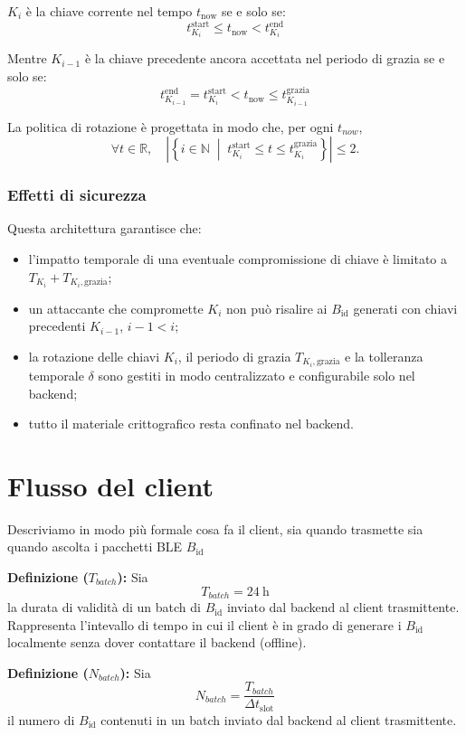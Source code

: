 \documentclass[a4paper,11pt]{article}
\begin{document}
$K_i$ è la chiave corrente nel tempo \(t_{\text{now}}\) se e solo se:
\[
  t_{K_i}^{\text{start}} \leq t_{\text{now}} < t_{K_i}^{\text{end}}
\]


Mentre $K_{i-1}$ è la chiave precedente ancora accettata nel periodo di grazia se e solo se:
\[
  t_{K_{i-1}}^{\text{end}} = t_{K_i}^{\text{start}} < t_{\text{now}} \leq t_{K_{i-1}}^{\text{grazia}}
\]

La politica di rotazione è progettata in modo che, per ogni $t_{now}$,
\[
  \forall t \in \mathbb{R}, \quad
  \left|
  \left\{
  i \in \mathbb{N}
  \;\middle|\;
  t_{K_i}^{\text{start}} \le t \le t_{K_i}^{\text{grazia}}
  \right\}
  \right| \le 2.
\]

\subsubsection{Effetti di sicurezza}
Questa architettura garantisce che:
\begin{itemize}
  \item l'impatto temporale di una eventuale compromissione di chiave è limitato a \(T_{K_i} + T_{K_i,\mathrm{grazia}}\);
  \item un attaccante che compromette \(K_i\) non può risalire ai \(B_{\text{id}}\) generati con chiavi precedenti \(K_{i-1}\), \(i-1 < i\);
  \item la rotazione delle chiavi \(K_i\), il periodo di grazia \(T_{K_i,\mathrm{grazia}}\) e la tolleranza temporale \(\delta\) sono gestiti in modo centralizzato e configurabile solo nel backend;
  \item tutto il materiale crittografico resta confinato nel backend.
\end{itemize}

\section{Flusso del client}
Descriviamo in modo più formale cosa fa il client, sia quando trasmette sia quando ascolta i pacchetti BLE \(B_{\text{id}}\)

\textbf{Definizione (\(T_{batch}\)):} Sia
\[
  T_{batch} = \SI{24}{\hour}
\]
la durata di validità di un batch di \(B_{\text{id}}\) inviato dal backend al client trasmittente.
Rappresenta l'intevallo di tempo in cui il client è in grado di generare i \(B_{\text{id}}\) localmente senza dover contattare il backend (offline).

\textbf{Definizione (\(N_{batch}\)):} Sia
\[
  N_{batch} = \frac{T_{batch}}{\Delta t_{\text{slot}}}
\]
il numero di \(B_{\text{id}}\) contenuti in un batch inviato dal backend al client trasmittente.
\end{document}
